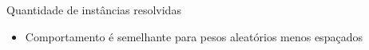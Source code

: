 \documentclass[dvipsnames]{beamer}
\begin{document}
\begin{frame}{Quantidade de instâncias resolvidas}
\begin{figure}%
    \centering
    \caption{}%
    \label{fig:tree_sf4_s20_50_random}%
\end{figure}

\begin{itemize}
  \item Comportamento é semelhante para pesos aleatórios menos espaçados
  \end{itemize}
\end{frame}
\end{document}
